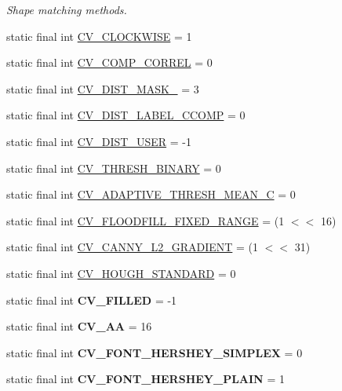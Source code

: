 \begin{DoxyCompactItemize}
\begin{DoxyCompactList}\small\item\em Shape matching methods. \end{DoxyCompactList}\item 
static final int \hyperlink{group__imgproc__c_gae2c5ffaf8ec924eefd838dc3f2ce715c}{C\+V\+\_\+\+C\+L\+O\+C\+K\+W\+I\+SE} = 1
\item 
static final int \hyperlink{group__imgproc__c_ga19d630356bddcc778302f908259f7f05}{C\+V\+\_\+\+C\+O\+M\+P\+\_\+\+C\+O\+R\+R\+EL} = 0
\item 
static final int \hyperlink{group__imgproc__c_gaba3e402b3c0ce6821575a846d3473ff5}{C\+V\+\_\+\+D\+I\+S\+T\+\_\+\+M\+A\+S\+K\+\_} = 3
\item 
static final int \hyperlink{group__imgproc__c_ga020e0b6cf0f5935cc6d68815b04f7651}{C\+V\+\_\+\+D\+I\+S\+T\+\_\+\+L\+A\+B\+E\+L\+\_\+\+C\+C\+O\+MP} = 0
\item 
static final int \hyperlink{group__imgproc__c_gad0b2f87dbc9bce7d2a18cf13cf1ccc79}{C\+V\+\_\+\+D\+I\+S\+T\+\_\+\+U\+S\+ER} = -\/1
\item 
static final int \hyperlink{group__imgproc__c_gaf5fab0d499ae9f3e639abf67052b7bc0}{C\+V\+\_\+\+T\+H\+R\+E\+S\+H\+\_\+\+B\+I\+N\+A\+RY} = 0
\item 
static final int \hyperlink{group__imgproc__c_ga6503a819d73170b078c6d83a7f160393}{C\+V\+\_\+\+A\+D\+A\+P\+T\+I\+V\+E\+\_\+\+T\+H\+R\+E\+S\+H\+\_\+\+M\+E\+A\+N\+\_\+C} = 0
\item 
static final int \hyperlink{group__imgproc__c_gac18e8679fec0c9c885f48bb38cab30d3}{C\+V\+\_\+\+F\+L\+O\+O\+D\+F\+I\+L\+L\+\_\+\+F\+I\+X\+E\+D\+\_\+\+R\+A\+N\+GE} = (1 $<$$<$ 16)
\item 
static final int \hyperlink{group__imgproc__c_gac8599b677d21172853e57b31a4240338}{C\+V\+\_\+\+C\+A\+N\+N\+Y\+\_\+\+L2\+\_\+\+G\+R\+A\+D\+I\+E\+NT} = (1 $<$$<$ 31)
\item 
static final int \hyperlink{group__imgproc__c_ga844fa35a2af5301ad52370b31aea2155}{C\+V\+\_\+\+H\+O\+U\+G\+H\+\_\+\+S\+T\+A\+N\+D\+A\+RD} = 0
\item 
static final int {\bfseries C\+V\+\_\+\+F\+I\+L\+L\+ED} = -\/1
\item 
static final int {\bfseries C\+V\+\_\+\+AA} = 16
\item 
static final int {\bfseries C\+V\+\_\+\+F\+O\+N\+T\+\_\+\+H\+E\+R\+S\+H\+E\+Y\+\_\+\+S\+I\+M\+P\+L\+EX} = 0
\item 
static final int {\bfseries C\+V\+\_\+\+F\+O\+N\+T\+\_\+\+H\+E\+R\+S\+H\+E\+Y\+\_\+\+P\+L\+A\+IN} = 1

\end{DoxyCompactItemize}
